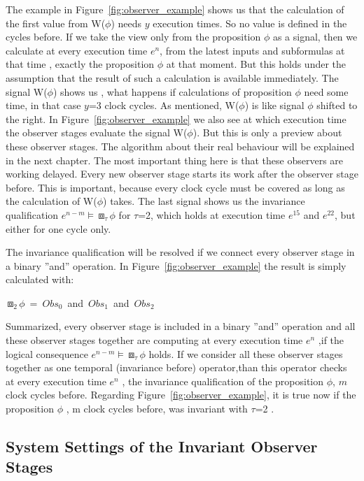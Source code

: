 The example in Figure~\ref{fig:observer_example} shows us that the calculation of the first value from  W($\phi$) needs $y$
execution times. So no value is defined in the cycles before. If we take the view only from the proposition $\phi$ as a signal, then we calculate
at every execution time $e^n$, from the latest inputs and subformulas at that time , exactly the proposition $\phi$ at that moment.
But this holds under the assumption that the result of such a calculation is available immediately.
The signal W($\phi$) shows us , what happens if calculations of proposition $\phi$ need some time, in that case $y$=3 clock cycles.
As mentioned, W($\phi$) is like signal $\phi$ shifted to the right.
In Figure~\ref{fig:observer_example} we also see at which execution time the observer stages evaluate the signal W($\phi$).
But this is only a preview about these observer stages. The algorithm about their real behaviour will be explained in the next chapter.
The most important thing here is that these observers are working delayed. Every new observer stage starts its work after the observer stage before.
This is important, because every clock cycle must be covered as long as the calculation of W($\phi$) takes. 
The last signal shows us the invariance qualification $e^{n-m} \models \boxbox_\tau \phi$ for $\tau$=2, which holds at execution time $e^{15}$ and $e^{22}$,
but either for one cycle only.

The invariance qualification will be resolved if we connect every observer stage in a binary ''and'' operation.
In Figure~\ref{fig:observer_example} the result is simply calculated with:
\newline
\begin{center} 
\mbox{$\boxbox_2 \phi$ =  $Obs_0$ and  $Obs_1$  and  $Obs_2$}
\end{center}
\newpage
Summarized,  every observer stage is included in a binary ''and'' operation and all these observer stages together are computing at every execution time $e^n$
,if the logical consequence $e^{n-m} \models \boxbox_\tau \phi$ holds. 
If we consider all these observer stages together as one temporal (invariance before) operator,than this operator checks
at every execution time  $e^n$ , the invariance qualification of the proposition $\phi$, $m$ clock cycles before.
Regarding Figure~\ref{fig:observer_example}, it is true now if the proposition $\phi$ , m clock cycles before, was invariant with $\tau$=2 .
\newline

\subsection{System Settings of the Invariant Observer Stages}

